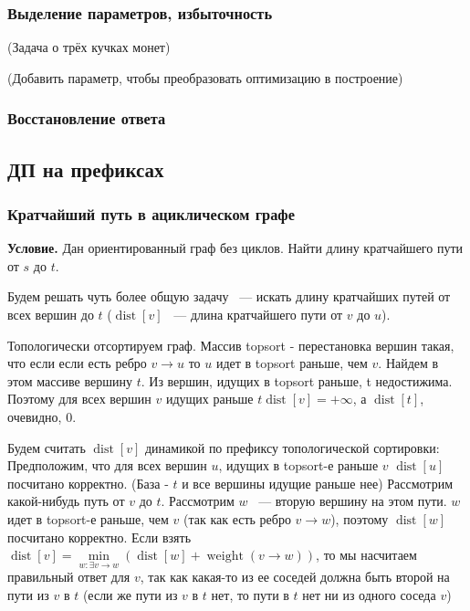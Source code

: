 \documentclass[a4paper,12pt]{article}
\begin{document}
      \subsubsection{Выделение параметров, избыточность}

      (Задача о трёх кучках монет)

      (Добавить параметр, чтобы преобразовать оптимизацию в построение)

      \subsubsection{Восстановление ответа}

    \subsection{ДП на префиксах}

      \subsubsection{Кратчайший путь в ациклическом графе}
      \textbf{Условие.} Дан ориентированный граф без циклов. Найти 
      длину кратчайшего пути от $s$ до $t$.
      
      Будем решать чуть более общую задачу ~--- искать длину кратчайших 
      путей от всех вершин до $t$ ($\operatorname{dist}[v]$ ~--- длина 
      кратчайшего пути от $v$ до $u$).
      
      Топологически отсортируем граф. Массив topsort - перестановка 
      вершин такая, что если если есть ребро $v\rightarrow u$ то $u$ 
      идет в topsort раньше, чем $v$. Найдем в этом массиве вершину $t$. 
      Из вершин, идущих в topsort раньше, t недостижима. Поэтому 
      для всех вершин $v$ идущих раньше $t \operatorname{dist}[v] = +\infty$, а 
      $\operatorname{dist}[t]$, очевидно, $0$.
      
      Будем считать $\operatorname{dist}[v]$ динамикой по префиксу 
      топологической сортировки:
      Предположим, что для всех вершин $u$, идущих в topsort-е раньше $v$ 
      $\operatorname{dist}[u]$ посчитано корректно. (База - $t$ и все 
      вершины идущие раньше нее) Рассмотрим какой-нибудь путь от $v$ до $t$. 
      Рассмотрим $w$ ~--- вторую вершину на этом пути. $w$ идет в topsort-е 
      раньше, чем $v$ (так как есть ребро $v\rightarrow w$), поэтому 
      $\operatorname{dist}[w]$ посчитано корректно. Если взять
      $\operatorname{dist}[v] = \min\limits_{w: \exists v \rightarrow w}
      (\operatorname{dist}[w] + \operatorname{weight}(v \rightarrow w))$, 
      то мы насчитаем правильный ответ для $v$, так как какая-то из ее соседей 
      должна быть второй на пути из $v$ в $t$ (если же пути из $v$ в $t$ нет, 
      то пути в $t$ нет ни из одного соседа $v$)
      
\end{document}
